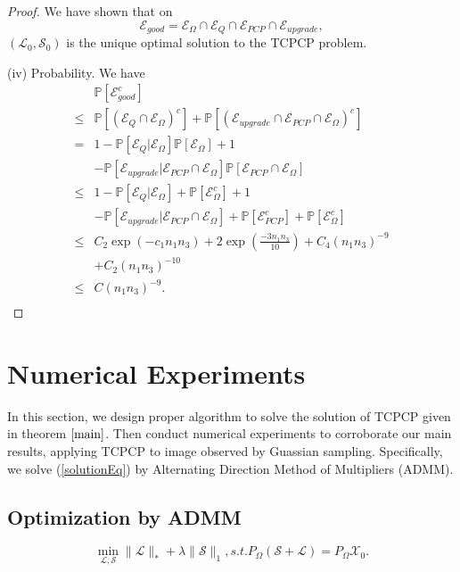 \documentclass[journal,transmag]{IEEEtran}
\theoremstyle{plain}
\begin{document}
\begin{proof}
We have shown that on
\begin{equation}
\mathcal{E}_{good}=\mathcal{E}_{\Omega}\cap\mathcal{E}_{Q}\cap\mathcal{E}_{PCP}\cap\mathcal{E}_{upgrade},
\end{equation}
$(\mathcal{L}_0,\mathcal{S}_0)$ is the unique optimal solution to the TCPCP problem.

(iv) Probability. We have
\begin{equation}
\begin{split}
&\mathbb{P}[\mathcal{E}^c_{good}]\\
\le & \mathbb{P}[(\mathcal{E}_Q\cap\mathcal{E}_{\Omega})^c]
+\mathbb{P}[(\mathcal{E}_{upgrade}\cap\mathcal{E}_{PCP}\cap\mathcal{E}_{\Omega})^c]\\
=& 1-\mathbb{P}[\mathcal{E}_Q|\mathcal{E}_{\Omega}]\mathbb{P}[\mathcal{E}_{\Omega}]+
1\\
&-\mathbb{P}[\mathcal{E}_{upgrade}|\mathcal{E}_{PCP}\cap\mathcal{E}_{\Omega}]\mathbb{P}[\mathcal{E}_{PCP}\cap\mathcal{E}_{\Omega}]\\
\le  & 1-\mathbb{P}[\mathcal{E}_Q|\mathcal{E}_{\Omega}]+\mathbb{P}[\mathcal{E}_{\Omega}^c]+
1\\
&-\mathbb{P}[\mathcal{E}_{upgrade}|\mathcal{E}_{PCP}\cap\mathcal{E}_{\Omega}]+\mathbb{P}[\mathcal{E}_{PCP}^c]+\mathbb{P}[\mathcal{E}_{\Omega}^c]\\ \le & C_2 \exp(-c_1 n_1 n_3)+ 2\exp(\frac{-3n_1 n_3}{10})+C_4 (n_1 n_3)^{-9}\\
&+C_2 (n_1 n_3)^{-10}\\
\le &C(n_1 n_3)^{-9}. \\
\end{split}
\end{equation}
\end{proof}
\section{Numerical Experiments}
In this section, we design proper algorithm to solve the solution of TCPCP given in theorem $\ref{main}$. Then conduct numerical experiments to corroborate our main results, applying TCPCP to image observed by Guassian sampling. Specifically, we solve (\ref{solutionEq}) by Alternating Direction Method of Multipliers (ADMM).
\subsection{Optimization by ADMM}

\begin{equation}
\min_{\mathcal{L},\mathcal{S}}\|\mathcal{L}\|_*+\lambda \|\mathcal{S}\|_1, s.t. P_{\Omega}(\mathcal{S+L})=P_{\Omega}\mathcal{X}_0.
\end{equation}
\end{document}
